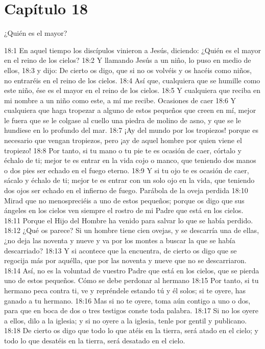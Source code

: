 \section*{Capítulo 18}
¿Quién es el mayor?  

18:1 En aquel tiempo los discípulos vinieron a Jesús, diciendo: ¿Quién es el mayor en el reino de los cielos? 
18:2 Y llamando Jesús a un niño, lo puso en medio de ellos, 
18:3 y dijo: De cierto os digo, que si no os volvéis y os hacéis como niños, no entraréis en el reino de los cielos. 
18:4 Así que, cualquiera que se humille como este niño, ése es el mayor en el reino de los cielos. 
18:5 Y cualquiera que reciba en mi nombre a un niño como este, a mí me recibe. 
Ocasiones de caer  
18:6 Y cualquiera que haga tropezar a alguno de estos pequeños que creen en mí, mejor le fuera que se le colgase al cuello una piedra de molino de asno, y que se le hundiese en lo profundo del mar. 
18:7 ¡Ay del mundo por los tropiezos! porque es necesario que vengan tropiezos, pero ¡ay de aquel hombre por quien viene el tropiezo! 
18:8 Por tanto, si tu mano o tu pie te es ocasión de caer, córtalo y échalo de ti; mejor te es entrar en la vida cojo o manco, que teniendo dos manos o dos pies ser echado en el fuego eterno. 
18:9 Y si tu ojo te es ocasión de caer, sácalo y échalo de ti; mejor te es entrar con un solo ojo en la vida, que teniendo dos ojos ser echado en el infierno de fuego. 
Parábola de la oveja perdida  
18:10 Mirad que no menospreciéis a uno de estos pequeños; porque os digo que sus ángeles en los cielos ven siempre el rostro de mi Padre que está en los cielos. 
18:11 Porque el Hijo del Hombre ha venido para salvar lo que se había perdido. 
18:12 ¿Qué os parece? Si un hombre tiene cien ovejas, y se descarría una de ellas, ¿no deja las noventa y nueve y va por los montes a buscar la que se había descarriado? 
18:13 Y si acontece que la encuentra, de cierto os digo que se regocija más por aquélla, que por las noventa y nueve que no se descarriaron. 
18:14 Así, no es la voluntad de vuestro Padre que está en los cielos, que se pierda uno de estos pequeños. 
Cómo se debe perdonar al hermano 
18:15 Por tanto, si tu hermano peca contra ti, ve y repréndele estando tú y él solos; si te oyere, has ganado a tu hermano. 
18:16 Mas si no te oyere, toma aún contigo a uno o dos, para que en boca de dos o tres testigos conste toda palabra. 
18:17 Si no los oyere a ellos, dilo a la iglesia; y si no oyere a la iglesia, tenle por gentil y publicano. 
18:18 De cierto os digo que todo lo que atéis en la tierra, será atado en el cielo; y todo lo que desatéis en la tierra, será desatado en el cielo. 

